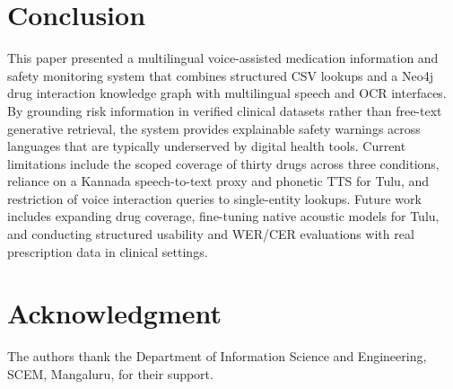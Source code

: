 \documentclass[9pt,journal,twoside,web]{ieeecolor}
\begin{document}
\section{Conclusion}
\label{sec:conclusion}
This paper presented a multilingual voice-assisted medication information and safety monitoring system that combines structured CSV lookups and a Neo4j drug interaction knowledge graph with multilingual speech and OCR interfaces. By grounding risk information in verified clinical datasets rather than free-text generative retrieval, the system provides explainable safety warnings across languages that are typically underserved by digital health tools. Current limitations include the scoped coverage of thirty drugs across three conditions, reliance on a Kannada speech-to-text proxy and phonetic TTS for Tulu, and restriction of voice interaction queries to single-entity lookups. Future work includes expanding drug coverage, fine-tuning native acoustic models for Tulu, and conducting structured usability and WER/CER evaluations with real prescription data in clinical settings.

\section*{Acknowledgment}
The authors thank the Department of Information Science and Engineering, SCEM, Mangaluru, for their support.
\end{document}
